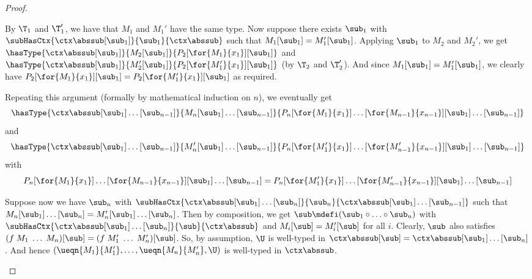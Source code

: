 \begin{proof}
\begin{itemize}
  By $\T_1$ and $\T_1'$, we have that $M_1$ and $M_1'$ have the same type.
  Now suppose there exists $\sub_1$ with $\subHasCtx{\ctx \abssub [\sub_1]}{\sub_1}{\ctx \abssub}$ such that $M_1[\sub_1] = M_1'[\sub_1]$.
  Applying $\sub_1$ to $M_2$ and $M_2'$, we get $\hasType{\ctx \abssub [\sub_1]}{M_2[\sub_1]}{P_2[\for{M_1}{x_1}][\sub_1]}$ and $\hasType{\ctx \abssub [\sub_1]}{M_2'[\sub_1]}{P_2[\for{M_1'}{x_1}][\sub_1]}$ (by $\T_2$ and $\T_2'$).
  And since $M_1[\sub_1] = M_1'[\sub_1]$, we clearly have $P_2[\for{M_1}{x_1}][\sub_1] = P_2[\for{M_1'}{x_1}][\sub_1]$ as required.
  
  Repeating this argument (formally by mathematical induction on $n$), we eventually get
  \[ \hasType{\ctx \abssub [\sub_1] \ldots [\sub_{n-1}]}{M_n[\sub_1] \ldots [\sub_{n-1}]}{P_n[\for{M_1}{x_1}] \ldots [\for{M_{n-1}}{x_{n-1}}][\sub_1] \ldots [\sub_{n-1}]} \]
  and
  \[ \hasType{\ctx \abssub [\sub_1] \ldots [\sub_{n-1}]}{M_n'[\sub_1] \ldots [\sub_{n-1}]}{P_n[\for{M_1'}{x_1}] \ldots [\for{M_{n-1}'}{x_{n-1}}][\sub_1] \ldots [\sub_{n-1}]} \]
  with
  \[ P_n[\for{M_1}{x_1}] \ldots [\for{M_{n-1}}{x_{n-1}}][\sub_1] \ldots [\sub_{n-1}] = P_n[\for{M_1'}{x_1}] \ldots [\for{M_{n-1}'}{x_{n-1}}][\sub_1] \ldots [\sub_{n-1}] \]
  
  Suppose now we have $\sub_n$ with $\subHasCtx{\ctx \abssub [\sub_1] \ldots [\sub_n]}{\sub_n}{\ctx \abssub [\sub_1] \ldots [\sub_{n-1}]}$ such that $M_n[\sub_1] \ldots [\sub_n] = M_n'[\sub_1] \ldots [\sub_n]$.
  Then by composition, we get $\sub \mdefi (\sub_1 \circ \ldots \circ \sub_n)$ with $\subHasCtx{\ctx \abssub [\sub_1] \ldots [\sub_n]}{\sub}{\ctx \abssub}$ and $M_i[\sub] = M_i'[\sub]$ for all $i$.
  Clearly, $\sub$ also satisfies $(f \; M_1 \; \ldots \; M_n)[\sub] = (f \; M_1' \; \ldots \; M_n')[\sub]$.
  So, by assumption, $\U$ is well-typed in $\ctx \abssub [\sub] = \ctx \abssub [\sub_1] \ldots [\sub_n]$.
  And hence $(\ueqn{M_1}{M_1'}, \ldots, \ueqn{M_n}{M_n'}, \U)$ is well-typed in $\ctx \abssub$.
  

\end{itemize}
\end{proof}
